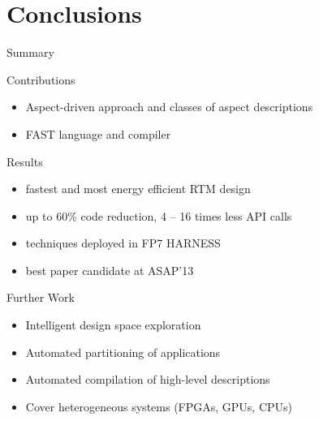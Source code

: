 \section{Conclusions}



\begin{frame}{Summary}
  \begin{beamerboxesrounded}{Contributions}
    \begin{itemize}
    \item  Aspect-driven approach and classes of aspect descriptions
    \item  FAST language and compiler
    \end{itemize}
  \end{beamerboxesrounded}
  \vspace{0.3cm}
  \begin{beamerboxesrounded}{Results}
    \begin{itemize}
    \item fastest and most energy efficient RTM design
    \item up to 60\% code reduction, 4 -- 16 times less API calls
    \item techniques deployed in FP7 HARNESS
    \item best paper candidate at ASAP'13
    \end{itemize}
  \end{beamerboxesrounded}
  \vspace{0.3cm}

  \begin{beamerboxesrounded}{Further Work}
    \begin{itemize}
    \item Intelligent design space exploration
    \item Automated partitioning of applications
    \item Automated compilation of high-level descriptions
    \item Cover heterogeneous systems (FPGAs, GPUs, CPUs)
    \end{itemize}
  \end{beamerboxesrounded}
\end{frame}
